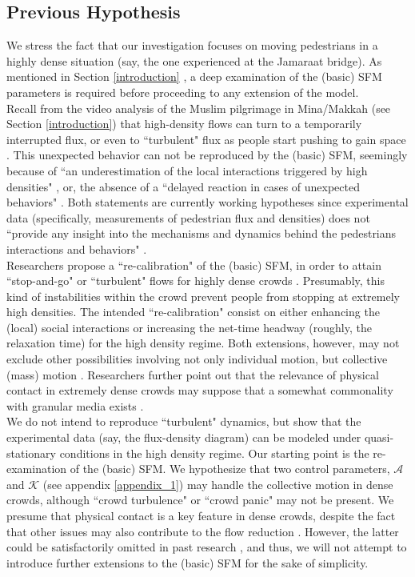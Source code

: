 
{\color{red}
\subsection{Previous Hypothesis}

We stress the fact that our investigation focuses on moving
pedestrians in a highly dense situation (say, the one experienced at
the Jamaraat bridge). As mentioned in Section \ref{introduction} , a deep
examination of the (basic) SFM parameters is required before
proceeding to any extension of the model.\\

Recall from the video analysis of the Muslim pilgrimage in Mina/Makkah
(see Section \ref{introduction}) that high-density flows can turn to a
temporarily interrupted flux, or even to ``turbulent" flux as people
start pushing to gain space \cite{helbing3}. This unexpected behavior can not be
reproduced by the (basic) SFM, seemingly because of ``an
underestimation of the local interactions triggered by high densities"
\cite{yu1}, or, the absence of a ``delayed reaction in cases of unexpected
behaviors" \cite{johansson}. Both statements are currently working hypotheses since
experimental data (specifically, measurements of pedestrian flux and
densities) does not ``provide any insight into the mechanisms and
dynamics behind the pedestrians interactions and behaviors" \cite{johansson}.\\

Researchers propose a ``re-calibration" of the (basic) SFM, in order to
attain ``stop-and-go" or ``turbulent" flows for highly dense crowds
\cite{yu1,johansson}. Presumably, this kind of instabilities within the crowd prevent
people from stopping at extremely high densities. The intended
``re-calibration" consist on either enhancing the (local) social
interactions or increasing the net-time headway (roughly, the
relaxation time) for the high density regime. Both extensions,
however, may not exclude other possibilities involving not only
individual motion, but collective (mass) motion \cite{helbing3}. Researchers
further point out that the relevance of physical contact in extremely
dense crowds may suppose that a somewhat commonality with granular
media exists \cite{helbing3}.\\

We do not intend to reproduce ``turbulent" dynamics, but show that the
experimental data (say, the flux-density diagram) can be modeled under
quasi-stationary conditions in the high density regime. Our starting
point is the re-examination of the (basic) SFM. We hypothesize that two
control parameters, $\mathcal{A}$ and $\mathcal{K}$ (see appendix \ref{appendix_1}) may handle
the collective motion in dense crowds, although ``crowd turbulence" or
``crowd panic" may not be present. We presume that physical contact is
a key feature in dense crowds, despite the fact that other issues may
also contribute to the flow reduction \cite{johansson1}. However, the latter could
be satisfactorily omitted in past research \cite{johansson}, and thus, we will not
attempt to introduce further extensions to the (basic) SFM for the
sake of simplicity.\\

}
